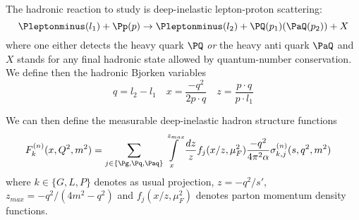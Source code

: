 The hadronic reaction to study is deep-inelastic lepton-proton scattering:
\begin{equation}
\Pleptonminus(l_1) + \Pp(p) \rightarrow \Pleptonminus(l_2) + \PQ(p_1)(\PaQ(p_2)) + X
\end{equation}
where one either detects the heavy quark $\PQ$ \textit{or} the heavy anti quark $\PaQ$ and $X$ stands for any final hadronic state allowed by quantum-number conservation. We define then the hadronic Bjorken variables
\begin{equation}
q=l_2-l_1 \quad x=\frac{-q^2}{2p\cdot q} \quad z = \frac{p\cdot q}{p\cdot l_1}
\end{equation}

We can then define the measurable deep-inelastic hadron structure functions
\begin{align}
F_{k}^{(n)}(x,Q^2,m^2) &= \sum_{j\in\{\Pg,\Pq,\Paq\}}\int\limits_x^{z_{max}} \frac{dz}{z} f_j(x/z,\mu_F^2) \frac{-q^2}{4\pi^2\alpha} \sigma^{(n)}_{k,j}(s,q^2,m^2)
\end{align}
where $k\in\{G,L,P\}$ denotes as usual projection, $z=-q^2/s'$, $z_{max} = -q^2/(4m^2-q^2)$ and $f_j(x/z,\mu_F^2)$ denotes parton momentum density functions.
